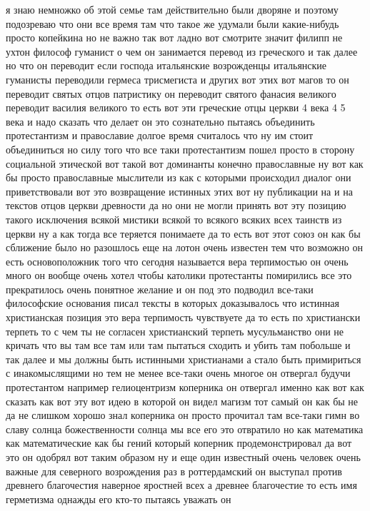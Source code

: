 я знаю немножко об этой семье там действительно были дворяне и поэтому
подозреваю что они все время там что такое же удумали были какие-нибудь просто
копейкина но не важно так вот ладно вот смотрите значит филипп не ухтон философ
гуманист о чем он занимается перевод из греческого и так далее но что он
переводит если господа итальянские возрожденцы итальянские гуманисты переводили
гермеса трисмегиста и других вот этих вот магов то он переводит святых отцов
патристику он переводит святого фанасия великого переводит василия великого то
есть вот эти греческие отцы церкви 4 века 4 5 века и надо сказать что делает он
это сознательно пытаясь объединить протестантизм и православие долгое время
считалось что ну им стоит объединиться но силу того что все таки протестантизм
пошел просто в сторону социальной этической вот такой вот доминанты конечно
православные ну вот как бы просто православные мыслители из как с которыми
происходил диалог они приветствовали вот это возвращение истинных этих вот ну
публикации на и на текстов отцов церкви древности да но они не могли принять вот
эту позицию такого исключения всякой мистики всякой то всякого всяких всех
таинств из церкви ну а как тогда все теряется понимаете да то есть вот этот союз
он как бы сближение было но разошлось еще на лотон очень известен тем что
возможно он есть основоположник того что сегодня называется вера терпимостью он
очень много он вообще очень хотел чтобы католики протестанты помирились все это
прекратилось очень понятное желание и он под это подводил все-таки философские
основания писал тексты в которых доказывалось что истинная христианская позиция
это вера терпимость чувствуете да то есть по христиански терпеть то с чем ты не
согласен христианский терпеть мусульманство они не кричать что вы там все там
или там пытаться сходить и убить там побольше и так далее и мы должны быть
истинными христианами а стало быть примириться с инакомыслящими но тем не менее
все-таки очень многое он отвергал будучи протестантом например гелиоцентризм
коперника он отвергал именно как вот как сказать как вот эту вот идею в которой
он видел магизм тот самый он как бы не да не слишком хорошо знал коперника он
просто прочитал там все-таки гимн во славу солнца божественности солнца мы все
его это отвратило но как математика как математические как бы гений который
коперник продемонстрировал да вот это он одобрял вот таким образом ну и еще один
известный очень человек очень важные для северного возрождения раз в
роттердамский он выступал против древнего благочестия наверное яростней всех а
древнее благочестие то есть имя герметизма однажды его кто-то пытаясь уважать он
